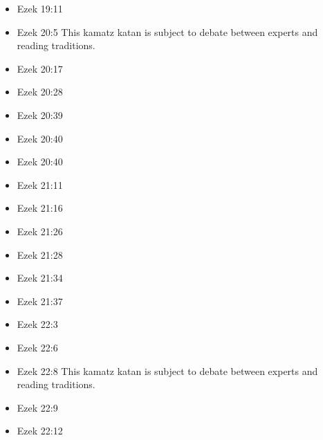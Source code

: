 \documentclass[14pt]{book}
\begin{document}
\begin{multicols}{2}
\begin{itemize}
										\item Ezek 19:11
										
										\item Ezek 20:5 This kamatz katan is subject to debate between experts and reading traditions.
										
										\item Ezek 20:17
										
										\item Ezek 20:28
										
										\item Ezek 20:39
										
										\item Ezek 20:40
										
										\item Ezek 20:40
										
										\item Ezek 21:11
										
										\item Ezek 21:16
										
										\item Ezek 21:26
										
										\item Ezek 21:28
												
												\item Ezek 21:34
												
												\item Ezek 21:37
												
												\item Ezek 22:3
												
												\item Ezek 22:6
												
												\item Ezek 22:8 This kamatz katan is subject to debate between experts and reading traditions.
												
												\item Ezek 22:9
												
												\item Ezek 22:12
												

\end{itemize}
\end{multicols}
\end{document}
